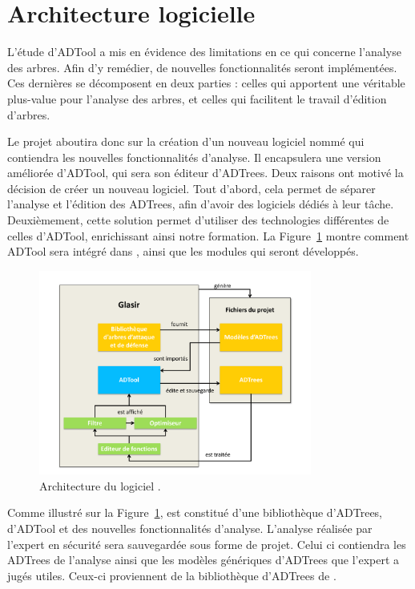 \section{Architecture logicielle}
	\label{section:archi}

L'étude d'ADTool a mis en évidence des limitations en ce qui concerne l'analyse des arbres. Afin d'y remédier, de nouvelles fonctionnalités seront implémentées. Ces dernières se décomposent en deux parties : celles qui apportent une véritable plus-value pour l'analyse des arbres, et celles qui facilitent le travail d'édition d'arbres. 

Le projet aboutira donc sur la création d'un nouveau logiciel nommé \glasir{} qui contiendra les nouvelles fonctionnalités d'analyse. Il encapsulera une version améliorée d'ADTool, qui sera son éditeur d'ADTrees. Deux raisons ont motivé la décision de créer un nouveau logiciel. Tout d'abord, cela permet de séparer l'analyse et l'édition des ADTrees, afin d'avoir des logiciels dédiés à leur tâche. Deuxièmement, cette solution permet d'utiliser des technologies différentes de celles d'ADTool, enrichissant ainsi notre formation. La {\sc Figure}~\ref{fig:architecture_Glasir} montre comment ADTool sera intégré dans \glasir{}, ainsi que les modules qui seront développés. %

	\begin{figure}[h!]
		\centering
			\includegraphics[width=0.8\textwidth]{figure/archiGlasir.pdf}
		\caption{Architecture du logiciel \glasir{}.}
		\label{fig:architecture_Glasir}
	\end{figure}

Comme illustré sur la {\sc Figure}~\ref{fig:architecture_Glasir}, \glasir{} est constitué d'une bibliothèque d'ADTrees, d'ADTool et des nouvelles fonctionnalités d'analyse.
L'analyse réalisée par l'expert en sécurité sera sauvegardée sous forme de projet.
Celui ci contiendra les ADTrees de l'analyse ainsi que les modèles génériques d'ADTrees que l'expert a jugés utiles. Ceux-ci proviennent de la bibliothèque d'ADTrees de \glasir{}.
	
